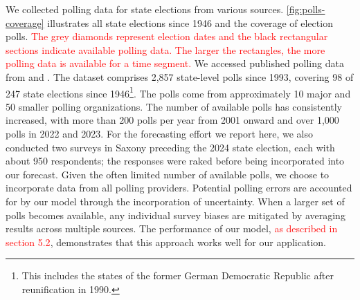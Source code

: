 \documentclass[doublespaced,12pt]{article}
\begin{document}
\begin{doublespacing}
We collected polling data for state elections from various sources. \autoref{fig:polls-coverage} illustrates all state elections since 1946 and the coverage of election polls. \textcolor{red}{The grey diamonds represent election dates and the black rectangular sections indicate available polling data. The larger the rectangles, the more polling data is available for a time segment.}
We accessed published polling data from \citet{dawum_state_polls} and \citet{wahlrecht_state_polls}. The dataset comprises 2,857 state-level polls since 1993, covering 98 of 247 state elections since 1946\footnote{This includes the states of the former German Democratic Republic after reunification in 1990.}. The polls come from approximately 10 major and 50 smaller polling organizations. The number of available polls has consistently increased, with more than 200 polls per year from 2001 onward and over 1,000 polls in 2022 and 2023. For the forecasting effort we report here, we also conducted two surveys in Saxony preceding the 2024 state election, each with about 950 respondents; the responses were raked before being incorporated into our forecast. Given the often limited number of available polls, we choose to incorporate data from all polling providers. Potential polling errors are accounted for by our model through the incorporation of uncertainty. 
When a larger set of polls becomes available, any individual survey biases are mitigated by averaging results across multiple sources. The  performance of our model, \textcolor{red}{as described in section 5.2}, demonstrates that this approach works well for our application.







\end{doublespacing}
\end{document}
